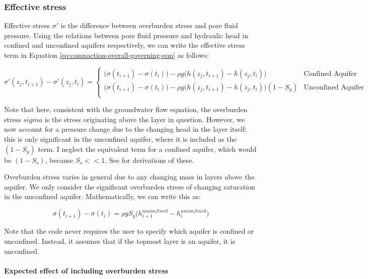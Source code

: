 \documentclass{article}
\begin{document}
\subsubsection{Effective stress}

Effective stress $\sigma'$ is the difference between overburden stress and pore fluid pressure. Using the relations between pore fluid pressure and hydraulic head in confined and unconfined aquifers respectively, we can write the effective stress term in Equation \ref{eq:compaction-overall-governing-eqn} as follows:

\begin{equation}
\label{eqn:effective-stress} 
\sigma'(z_j,t_{i+1}) - \sigma'(z_j,t_i) =
\begin{cases}
\bigg( \sigma (t_{i+1}) - \sigma(t_i) \bigg) - \rho g \big( h(z_j,t_{i+1}) - h(z_j,t_i) \big) & \text{Confined Aquifer} \\
\bigg( \sigma (t_{i+1}) - \sigma(t_i) \bigg) - \rho g \big( h(z_j,t_{i+1}) - h(z_j,t_i) \big)(1-S_y) & \text{Unconfined Aquifer} \\
\end{cases}
\end{equation}

Note that here, consistent with the groundwater flow equation, the overburden stress $sigma$ is the stress originating above the layer in question. However, we now account for a pressure change due to the changing head in the layer itself; this is only significant in the unconfined aquifer, where it is included as the $(1-S_y)$ term. I neglect the equivalent term for a confined aquifer, which would be $(1-S_s)$, because $S_s << 1$. See \cite{poland_land_1969} for derivations of these. 

Overburden stress varies in general due to any changing mass in layers above the aquifer. We only consider the significant overburden stress of changing saturation in the unconfined aquifer. Mathematically, we can write this as:

\begin{equation}
\label{eq:overburden}
\sigma (t_{i+1}) - \sigma(t_i) = \rho g S_y \big( h^{unconfined}_{i+1} - h^{unconfined}_i \big)
\end{equation}

Note that the code never requires the user to specify which aquifer is confined or unconfined. Instead, it assumes that if the topmost layer is an aquifer, it is unconfined.

\paragraph{Expected effect of including overburden stress}
\label{sec:overburden-compaction}
\end{document}
